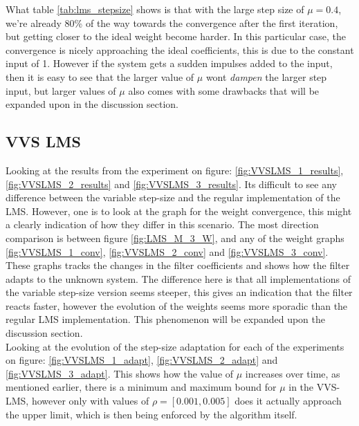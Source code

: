 What table \ref{tab:lms_stepsize} shows is that with the large step size of $\mu=0.4$, we're already 
80\% of the way towards the convergence after the first iteration, but getting closer
to the ideal weight become harder. In this particular case, the convergence is nicely approaching the
ideal coefficients, this is due to the constant input of 1. However if the system gets a sudden impulses
added to the input, then it is easy to see that the larger value of $\mu$ wont \textit{dampen} the larger step input,
but larger values of $\mu$ also comes with some drawbacks that will be expanded upon in the discussion section.
 



\subsection{VVS LMS}
Looking at the results from the experiment on figure: \ref{fig:VVSLMS_1_results}, \ref{fig:VVSLMS_2_results} and \ref{fig:VVSLMS_3_results}. 
Its difficult to see any difference between the variable step-size and the regular implementation of the LMS. However, one is to look at the
graph for the weight convergence, this might a clearly indication of how they differ in this scenario. The most
direction comparison is between figure \ref{fig:LMS_M_3_W}, and any of the weight graphs 
\ref{fig:VVSLMS_1_conv}, \ref{fig:VVSLMS_2_conv} and \ref{fig:VVSLMS_3_conv}.\\
These graphs
tracks the changes in the filter coefficients and shows how the filter adapts to the unknown system.
The difference here is that all implementations of the variable step-size version seems steeper, this
gives an indication that the filter reacts faster, however the evolution of the weights seems more sporadic than 
the regular LMS implementation. This phenomenon will be expanded upon the discussion section.
\\

Looking at the evolution of the step-size adaptation for each of the experiments on figure: 
\ref{fig:VVSLMS_1_adapt}, \ref{fig:VVSLMS_2_adapt} and \ref{fig:VVSLMS_3_adapt}. This shows how the value
of $\mu$ increases over time, as mentioned earlier, there is a minimum and maximum bound for $\mu$ 
in the VVS-LMS, however only with values of $\rho=[0.001, 0.005]$ does it actually approach the upper limit,
which is then being enforced by the algorithm itself. 



